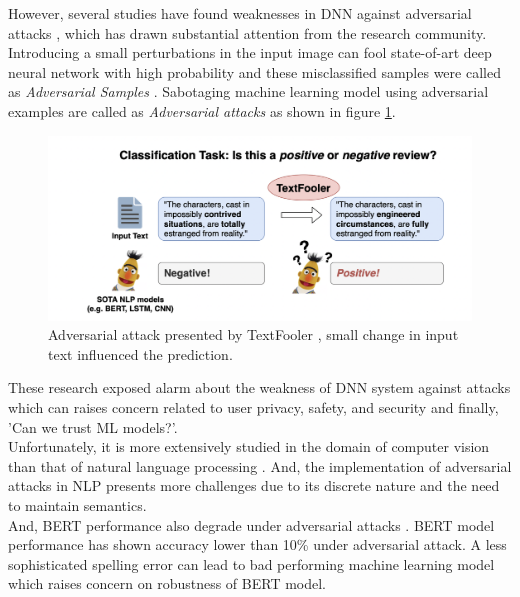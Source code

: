 \documentclass[%
	BCOR=8mm, %
	DIV=12, 
	toc=bibliography, %
	toc=listof, %
	oneside, %
	egregdoesnotlikesansseriftitles, %
	]{scrbook}
\begin{document}
However, several studies have found weaknesses in DNN  against adversarial attacks \cite{szegedy_intriguing_2014,yuan_adversarial_2018,akhtar_threat_2018,huq_adversarial_2020,zhang_adversarial_2019}, which has drawn substantial attention from the research community. \\ 
Introducing a small perturbations in the input image can fool state-of-art deep neural network with high probability and these misclassified samples were called as \textit{Adversarial Samples} \cite{szegedy_intriguing_2014}. Sabotaging machine learning model using adversarial examples are called as \textit{Adversarial attacks} as shown in figure \ref{diag:ExampleAdversarial}. 
\begin{figure}[h!]
\centering
\includegraphics[width=.97\textwidth]{img/Introduction-Fig-1.png}
\caption[Adversarial Example]{Adversarial attack presented by TextFooler \cite{jin_is_2020}, small change in input text influenced the prediction.}
\label{diag:ExampleAdversarial}
\end{figure}
These research exposed alarm about the weakness of DNN system against attacks which can raises concern related to user privacy, safety, and security and finally, 'Can we trust ML models?'.\\
Unfortunately, it is more extensively studied in the domain of computer vision than that of natural language processing \cite{wang_towards_2021}. And, the implementation of adversarial attacks in NLP presents more challenges due to its discrete nature and the need to maintain semantics\cite{li_bert-attack_2020}. \\
And, BERT performance also degrade under adversarial attacks \cite{li_bert-attack_2020,garg_bae_2020}. BERT model performance has shown accuracy lower than 10\% under adversarial attack. A less sophisticated spelling error can lead to bad performing machine learning model \cite{sun_adv-bert_2020} which raises concern on robustness of BERT model. 
\end{document}
